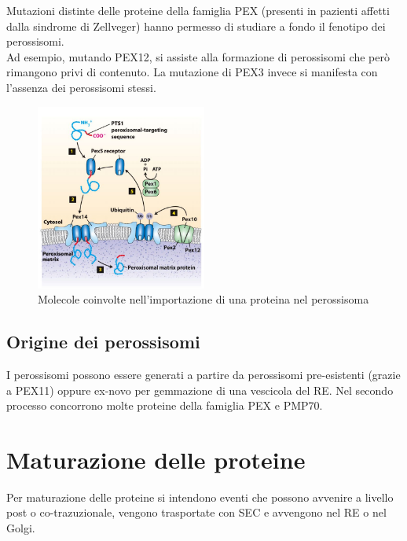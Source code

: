         Mutazioni distinte delle proteine della famiglia PEX (presenti in pazienti affetti dalla sindrome di Zellveger) hanno permesso di studiare a fondo il fenotipo dei perossisomi.\\
        Ad esempio, mutando PEX12, si assiste alla formazione di perossisomi che però rimangono privi di contenuto. La mutazione di PEX3 invece si manifesta con l'assenza dei perossisomi stessi. 
        \begin{figure}[h]
            \centering
            \includegraphics[width=0.5\textwidth]{images/importPerossisoma.JPG}
            \caption{\small Molecole coinvolte nell'importazione di una proteina nel perossisoma}
            \label{fig:mesh1}
        \end{figure}
        
    \subsection{Origine dei perossisomi}
        I perossisomi possono essere generati a partire da perossisomi pre-esistenti (grazie a PEX11) oppure ex-novo per gemmazione di una vescicola del RE. Nel secondo processo concorrono molte proteine della famiglia PEX e PMP70. \\

\section{Maturazione delle proteine}
    Per maturazione delle proteine si intendono eventi che possono avvenire a livello post o co-trazuzionale, vengono trasportate con SEC e avvengono nel RE o nel Golgi.
    
